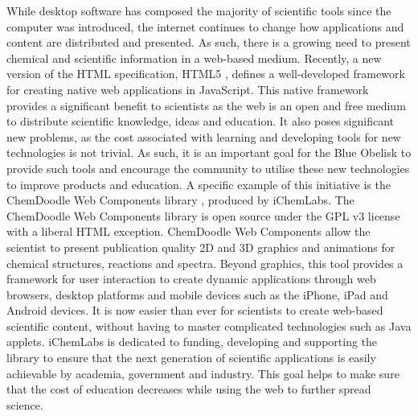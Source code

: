 \documentclass[10pt]{bmc_article}
\newenvironment{bmcformat}{\begin{raggedright}\baselineskip20pt\sloppy\setboolean{publ}{false}}{\end{raggedright}\baselineskip20pt\sloppy}
\begin{document}
\begin{bmcformat}
While desktop software has composed the majority of scientific tools
since the computer was introduced, the internet continues to change
how applications and content are distributed and presented. As such,
there is a growing need to present chemical and scientific information
in a web-based medium. Recently, a new version of the HTML
specification, HTML5 \cite{html5}, defines a well-developed framework
for creating native web applications in JavaScript. This native
framework provides a significant benefit to scientists as the web is
an open and free medium to distribute scientific knowledge, ideas and
education. It also poses significant new problems, as the cost
associated with learning and developing tools for new technologies is
not trivial. As such, it is an important goal for the Blue Obelisk to
provide such tools and encourage the community to utilise these new
technologies to improve products and education. A specific example of
this initiative is the ChemDoodle Web Components library
\cite{ChemDoodleWeb}, produced by iChemLabs. The ChemDoodle Web
Components library is open source under the GPL v3 license with a
liberal HTML exception. ChemDoodle Web Components allow the scientist
to present publication quality 2D and 3D graphics and animations for
chemical structures, reactions and spectra. Beyond graphics, this tool
provides a framework for user interaction to create dynamic
applications through web browsers, desktop platforms and mobile
devices such as the iPhone, iPad and Android devices. It is now easier
than ever for scientists to create web-based scientific content,
without having to master complicated technologies such as Java
applets. iChemLabs is dedicated to funding, developing and supporting
the library to ensure that the next generation of scientific
applications is easily achievable by academia, government and
industry. This goal helps to make sure that the cost of education
decreases while using the web to further spread science.


\end{bmcformat}
\end{document}

